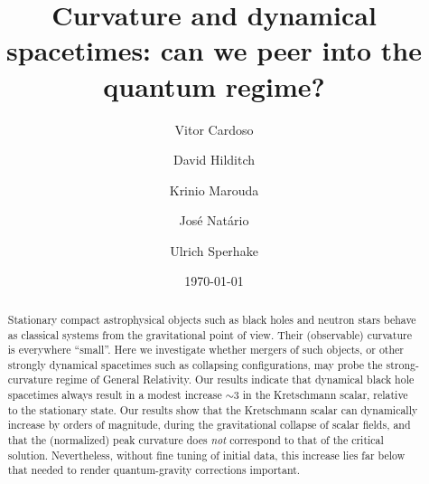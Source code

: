 \documentclass[floats,floatfix,showpacs,amssymb,prd,twocolumn,superscriptaddress,nofootinbib,nolongbibliography,reprint]{revtex4-2}
\begin{document}
\title{Curvature and dynamical spacetimes: can we peer into the quantum regime?}

\author{Vitor Cardoso} 

\author{David Hilditch} 
\author{Krinio Marouda} 

\author{Jos\'e Nat\'ario}

\author{Ulrich Sperhake}


\date{\today}

\begin{abstract}
Stationary compact astrophysical objects such as black holes and neutron stars behave as classical systems from the gravitational point of view. Their (observable) curvature is everywhere ``small''. Here we investigate whether mergers of such objects, or other strongly dynamical spacetimes such as collapsing configurations, may probe the strong-curvature regime of General Relativity. Our results indicate that dynamical black hole spacetimes always result in a modest increase $\sim 3$ in the Kretschmann scalar, relative to the stationary state. Our results show
that the Kretschmann scalar can dynamically increase by orders of magnitude, during the gravitational collapse of scalar fields, and that the (normalized) peak curvature does {\it not} correspond to that of the critical solution. Nevertheless, without fine tuning of initial data, this increase lies far below that needed to render quantum-gravity corrections important.
\end{abstract}

\maketitle
\end{document}
